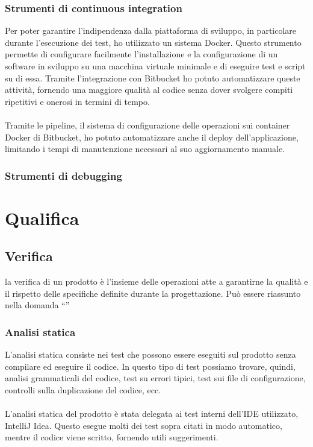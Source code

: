 		\subsubsection{Strumenti di continuous integration}
		Per poter garantire l'indipendenza dalla piattaforma di sviluppo, in particolare durante l'esecuzione dei test, ho utilizzato un sistema \gls{Docker}. Questo strumento permette di configurare facilmente l'installazione e la configurazione di un software in sviluppo su una macchina virtuale minimale e di eseguire test e script su di essa. Tramite l'integrazione con Bitbucket ho potuto automatizzare queste attività, fornendo una maggiore qualità al codice senza dover svolgere compiti ripetitivi e onerosi in termini di tempo.
		\paragraph*{}
		Tramite le pipeline, il sistema di configurazione delle operazioni sui container \gls{Docker} di Bitbucket, ho potuto automatizzare anche il deploy dell'applicazione, limitando i tempi di manutenzione necessari al suo aggiornamento manuale.

		\subsubsection{Strumenti di debugging} %

\section{Qualifica}
	\subsection{Verifica}
	la verifica di un prodotto è l'insieme delle operazioni atte a garantirne la qualità e il rispetto delle specifiche definite durante la progettazione. Può essere riassunto nella domanda ``''
		\subsubsection{Analisi statica}
		L'analisi statica consiste nei test che possono essere eseguiti sul prodotto senza compilare ed eseguire il codice. In questo tipo di test possiamo trovare, quindi, analisi grammaticali del codice, test su errori tipici, test sui file di configurazione, controlli sulla duplicazione del codice, ecc.
		\paragraph*{}
		L'analisi statica del prodotto è stata delegata ai test interni dell'IDE utilizzato, IntelliJ Idea. Questo esegue molti dei test sopra citati in modo automatico, mentre il codice viene scritto, fornendo utili suggerimenti.
